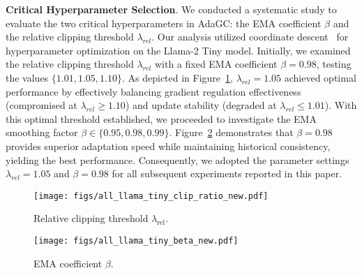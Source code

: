 \textbf{Critical Hyperparameter Selection}. We conducted a systematic study to evaluate the two critical hyperparameters in AdaGC: the EMA coefficient $\beta$ and the relative clipping threshold $\lambda_{rel}$. Our analysis utilized coordinate descent~\cite{bertsekas1997nonlinear} for hyperparameter optimization on the Llama-2 Tiny model. Initially, we examined the relative clipping threshold $\lambda_{rel}$ with a fixed EMA coefficient $\beta = 0.98$, testing the values $\{1.01, 1.05, 1.10\}$. As depicted in Figure~\ref{fig:llama_tiny_clip_ratio}, $\lambda_{rel} = 1.05$ achieved optimal performance by effectively balancing gradient regulation effectiveness (compromised at $\lambda_{rel} \ge 1.10$) and update stability (degraded at $\lambda_{rel} \le 1.01$). With this optimal threshold established, we proceeded to investigate the EMA smoothing factor $\beta \in \{0.95, 0.98, 0.99\}$. Figure~\ref{fig:llama_tiny_beta} demonstrates that $\beta = 0.98$ provides superior adaptation speed while maintaining historical consistency, yielding the best performance. Consequently, we adopted the parameter settings $\lambda_{rel} = 1.05$ and $\beta = 0.98$ for all subsequent experiments reported in this paper.
\begin{figure*}[!ht]
    \vskip 0.1in
    \centering
    \begin{subfigure}{0.5\textwidth}
        \centering
        \texttt{[image: figs/all\_llama\_tiny\_clip\_ratio\_new.pdf]}
        \caption{Relative clipping threshold $\lambda_{\text{rel}}$.}
        \label{fig:llama_tiny_clip_ratio}
    \end{subfigure}\hfill
    \begin{subfigure}{0.5\textwidth}
        \centering
        \texttt{[image: figs/all\_llama\_tiny\_beta\_new.pdf]}
        \caption{EMA coefficient $\beta$.}
        \label{fig:llama_tiny_beta}
    \end{subfigure}
    \caption{Study of AdaGC's hyperparameters on Llama-2 Tiny. (a) Relative clipping threshold analysis demonstrates $\lambda_{\text{rel}}=1.05$ achieves optimal gradient regulation. (b) EMA coefficient analysis reveals $\beta=0.98$ best balances historical consistency with rapid adaptation.}
    \label{fig:llama_tiny_ablation_study}
    \vskip -0.2in
\end{figure*}

